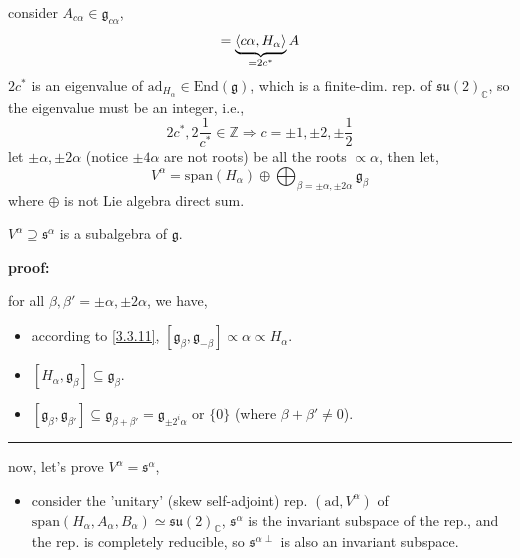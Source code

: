 \begin{itemize}
	\begin{tcolorbox}[title=proof:]
		consider $A_{c \alpha} \in \mathfrak{g}_{c \alpha}$,
		\begin{equation}
			[H_\alpha, A_{c \alpha}] = \underbrace{\braket{c \alpha, H_\alpha}}_{= 2 c^*} A
		\end{equation}
		$2 c^*$ is an eigenvalue of $\mathrm{ad}_{H_\alpha} \in \mathrm{End}(\mathfrak{g})$, which is a finite-dim. rep. of $\mathfrak{su}(2)_\mathbb{C}$, so the eigenvalue must be an integer, i.e.,
		\begin{equation}
			2 c^*, 2 \frac{1}{c^*} \in \mathbb{Z} \Longrightarrow c = \pm 1, \pm 2, \pm \frac{1}{2}
		\end{equation}
		let $\pm \alpha, \pm 2 \alpha$ (notice $\pm 4 \alpha$ are not roots) be all the roots $\propto \alpha$, then let,
		\begin{equation}
			V^\alpha = \mathrm{span}(H_\alpha) \oplus \bigoplus_{\beta = \pm \alpha, \pm 2 \alpha} \mathfrak{g}_{\beta}
		\end{equation}
		where $\oplus$ is not Lie algebra direct sum.
		
		$V^\alpha \supseteq \mathfrak{s}^\alpha$ is a subalgebra of $\mathfrak{g}$.
		
		\noindent\hdashrule[0.5ex]{\linewidth}{0.5pt}{1mm} %
		
		\textbf{proof:}
		
		for all $\beta, \beta' = \pm \alpha, \pm 2 \alpha$, we have,
		\begin{itemize}
			\item according to \eqref{3.3.11}, $[\mathfrak{g}_\beta, \mathfrak{g}_{- \beta}] \propto \alpha \propto H_\alpha$.
			
			\item $[H_\alpha, \mathfrak{g}_\beta] \subseteq \mathfrak{g}_\beta$.
			
			\item $[\mathfrak{g}_\beta, \mathfrak{g}_{\beta'}] \subseteq \mathfrak{g}_{\beta + \beta'} = \mathfrak{g}_{\pm 2^i \alpha}$ or $\{0\}$ (where $\beta + \beta' \neq 0$).
		\end{itemize}
		
		\noindent\rule[0.5ex]{\linewidth}{0.5pt} %
		
		now, let's prove $V^\alpha = \mathfrak{s}^\alpha$,
		\begin{itemize}
			\item consider the 'unitary' (skew self-adjoint) rep. $(\mathrm{ad}, V^\alpha)$ of $\mathrm{span}(H_\alpha, A_\alpha, B_\alpha) \simeq \mathfrak{su}(2)_\mathbb{C}$, $\mathfrak{s}^\alpha$ is the invariant subspace of the rep., and the rep. is completely reducible, so $\mathfrak{s}^{\alpha \perp}$ is also an invariant subspace.
			

\end{itemize}
\end{tcolorbox}
\end{itemize}
